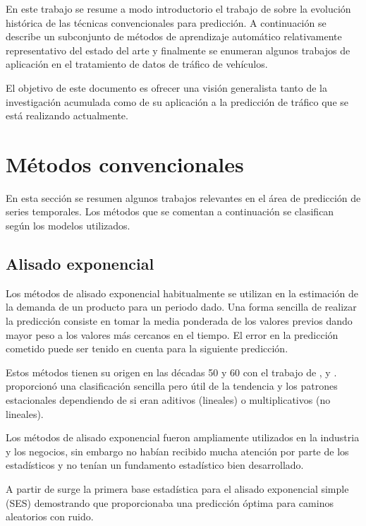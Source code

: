 \documentclass{llncs}
\begin{document}
En este trabajo se resume a modo introductorio el trabajo de \cite{DeGooijer2006443} sobre la evolución histórica de las técnicas convencionales para predicción. A continuación se describe un subconjunto de métodos de aprendizaje automático relativamente representativo del estado del arte y finalmente se enumeran algunos trabajos de aplicación en el tratamiento de datos de tráfico de vehículos.

El objetivo de este documento es ofrecer una visión generalista tanto de la investigación acumulada como de su aplicación a la predicción de tráfico que se está realizando actualmente.

\section{Métodos convencionales}

En esta sección se resumen algunos trabajos relevantes en el área de predicción de series temporales. Los métodos que se comentan a continuación se clasifican según los modelos utilizados. 

\subsection{Alisado exponencial}

Los métodos de alisado exponencial habitualmente se utilizan en la estimación de la demanda de un producto para un periodo dado. Una forma sencilla de realizar la predicción consiste en tomar la media ponderada de los valores previos dando mayor peso a los valores más cercanos en el tiempo. El error en la predicción cometido puede ser tenido en cuenta para la siguiente predicción.

Estos métodos tienen su origen en las décadas 50 y 60 con el trabajo de \cite{Brown1959}, \cite{Holt20045} y \cite{Winters1960324}. \cite{Pegels1969311} proporcionó una clasificación sencilla pero útil de la tendencia y los patrones estacionales dependiendo de si eran aditivos (lineales)  o multiplicativos (no lineales).

Los métodos de alisado exponencial fueron ampliamente utilizados en la industria y los negocios, sin embargo no habían recibido mucha atención por parte de los estadísticos y no tenían un fundamento estadístico bien desarrollado. 

A partir de \cite{Muth1960299} surge la primera base estadística para el alisado exponencial simple (SES) demostrando que proporcionaba una predicción óptima para caminos aleatorios con ruido. 
\end{document}
